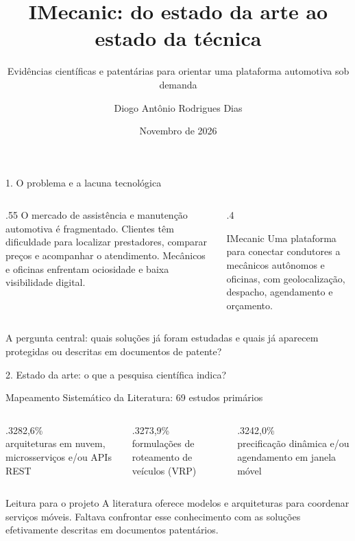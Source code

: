 \documentclass[aspectratio=169,10pt]{beamer}
\title[IMecanic]{IMecanic: do estado da arte ao estado da técnica}
\subtitle{Evidências científicas e patentárias para orientar uma plataforma automotiva sob demanda}
\author{Diogo Antônio Rodrigues Dias}
\institute{UNIRIO -- Metodologia Científica e Tecnológica}
\date{Novembro de 2026}
\begin{document}
\begin{frame}\titlepage\end{frame}
\begin{frame}{1. O problema e a lacuna tecnológica}
\begin{columns}[T]
\begin{column}{.55\textwidth}
\Large O mercado de assistência e manutenção automotiva é fragmentado.\vspace{.3cm}
\normalsize Clientes têm dificuldade para localizar prestadores, comparar preços e acompanhar o atendimento. Mecânicos e oficinas enfrentam ociosidade e baixa visibilidade digital.
\end{column}
\begin{column}{.4\textwidth}
\begin{block}{IMecanic}
Uma plataforma para conectar condutores a mecânicos autônomos e oficinas, com geolocalização, despacho, agendamento e orçamento.
\end{block}
\end{column}
\end{columns}
\vspace{.3cm}
\small A pergunta central: quais soluções já foram estudadas e quais já aparecem protegidas ou descritas em documentos de patente?
\end{frame}
\begin{frame}{2. Estado da arte: o que a pesquisa científica indica?}
\begin{center}\Large Mapeamento Sistemático da Literatura: 69 estudos primários\end{center}
\vspace{.2cm}
\begin{columns}[T]
\begin{column}{.32\textwidth}\centering\Huge 82,6\%\\\normalsize arquiteturas em nuvem, microsserviços e/ou APIs REST\end{column}
\begin{column}{.32\textwidth}\centering\Huge 73,9\%\\\normalsize formulações de roteamento de veículos (VRP)\end{column}
\begin{column}{.32\textwidth}\centering\Huge 42,0\%\\\normalsize precificação dinâmica e/ou agendamento em janela móvel\end{column}
\end{columns}
\vspace{.5cm}
\begin{alertblock}{Leitura para o projeto}
A literatura oferece modelos e arquiteturas para coordenar serviços móveis. Faltava confrontar esse conhecimento com as soluções efetivamente descritas em documentos patentários.
\end{alertblock}
\end{frame}
\end{document}
